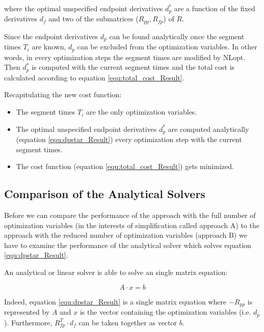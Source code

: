 where the optimal unspecified endpoint derivatives  $d_p^*$ are a function of the fixed derivatives $d_f$ and two of the submatrices ($R_{pp}, R_{fp}$) of $R$. \newline

Since the endpoint derivatives $d_p$ can be found analytically once the segment times $T_i$ are known, $d_p$ can be excluded from the optimization variables. In other words, in every optimization steps the segment times are modified by NLopt. Then $d_p^* $ is computed with the current segment times and the total cost is calculated according to equation \ref{equ:total_cost_Result}. \newline

Recapitulating the new cost function:

\begin{itemize}
  \item The segment times $T_i$ are the only optimization variables.
  \item The optimal unspecified endpoint derivatives $d_p^*$ are computed analytically (equation \ref{equ:dpstar_Result}) every optimization step with the current segment times.
    \item The cost function (equation \ref{equ:total_cost_Result}) gets minimized.
\end{itemize}

\subsection{Comparison of the Analytical Solvers}

Before we can compare the performance of the approach with the full number of optimization variables (in the interests of simplification called approach A) to the approach with the reduced number of optimization variables (approach B) we have to examine the performance of the analytical solver which solves equation \ref{equ:dpstar_Result}.\newline

An analytical or linear solver is able to solve an single matrix equation:

\begin{equation}
A \cdot x = b
\label{equ:linearSolver}
\end{equation}


Indeed, equation \ref{equ:dpstar_Result} is a single matrix equation where $-R_{pp}$ is represented by $A$ and $x$ is the vector containing the optimization variables (i.e. $d_p$). Furthermore, $R_{fp}^T \cdot d_f$ can be taken together as vector $b$. \newline

